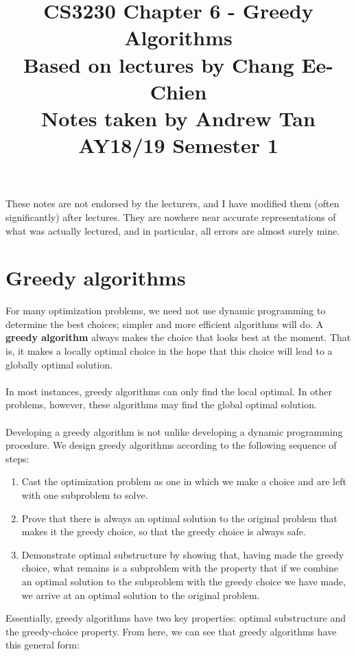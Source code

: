 \documentclass[a4paper]{article}
\title{%
	CS3230 Chapter 6 - Greedy Algorithms \\
	\large Based on lectures by Chang Ee-Chien
	\\ Notes taken by Andrew Tan
	\\ AY18/19 Semester 1
	\\ }
\author{}
\date{\vspace{-5ex}}
\begin{document}
\maketitle

\begin{center}\begin{minipage}[c]{0.9\textwidth}\centering\footnotesize These notes are not endorsed by the lecturers, and I have modified them (often significantly) after lectures. They are nowhere near accurate representations of what was actually lectured, and in particular, all errors are almost surely mine.\end{minipage}\end{center}

\section{Greedy algorithms}
For many optimization problems, we need not use dynamic programming to determine the best choices; simpler and more efficient algorithms will do. A \textbf{greedy algorithm} always makes the choice that looks best at the moment. That is, it makes a locally optimal choice in the hope that this choice will lead to a globally optimal solution.\\\\
In most instances, greedy algorithms can only find the local optimal. In other problems, however, these algorithms may find the global optimal solution.\\\\
Developing a greedy algorithm is not unlike developing a dynamic programming procedure. We design greedy algorithms according to the following sequence of steps:
\begin{enumerate}
	\item Cast the optimization problem as one in which we make a choice and are left with one subproblem to solve.
	\item Prove that there is always an optimal solution to the original problem that makes it the greedy choice, so that the greedy choice is always safe.
	\item Demonstrate optimal substructure by showing that, having made the greedy choice, what remains is a subproblem with the property that if we combine an optimal solution to the subproblem with the greedy choice we have made, we arrive at an optimal solution to the original problem.
\end{enumerate}
Essentially, greedy algorithms have two key properties: optimal substructure and the greedy-choice property. From here, we can see that greedy algorithms have this general form:
\end{document}
